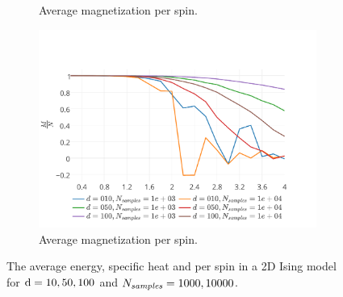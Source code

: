 \begin{figure}
\begin{subfigure}{\columnwidth}
		\caption{Average magnetization per spin.}
		\label{fig:results:2D:specificHeat}
	\end{subfigure}	
	\begin{subfigure}{\columnwidth}
		\centering
		\includegraphics[width=\textwidth]{./img/2D/averageMagnetization}
		\caption{Average magnetization per spin.}
		\label{fig:results:2D:averageMagnetization}
	\end{subfigure}		
	\caption{The  average energy,  specific heat and  per spin in a 2D Ising model for $\mathrm{d} = 10, 50, 100$ and $N_\textit{samples} = 1000, 10000$.}
	\label{fig:results:2D}
\end{figure}